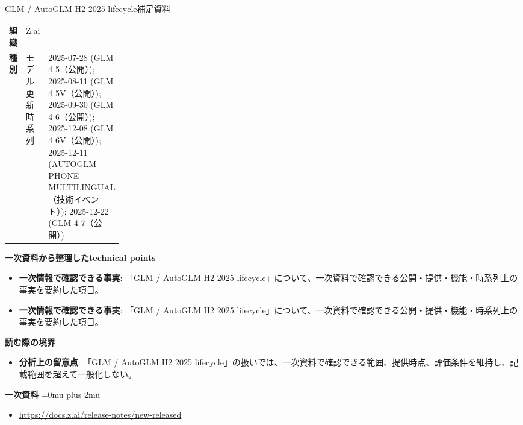 \begin{technicalnote}{GLM / AutoGLM H2 2025 lifecycle}{補足資料}
\begingroup
\begin{tabularx}{\linewidth}{@{}>{\bfseries}p{0.22\linewidth}X@{}}
組織 & Z.ai \\
種別 & モデル更新
時系列 & 2025-07-28 (GLM 4 5（公開）); 2025-08-11 (GLM 4 5V（公開）); 2025-09-30 (GLM 4 6（公開）); 2025-12-08 (GLM 4 6V（公開）); 2025-12-11 (AUTOGLM PHONE MULTILINGUAL（技術イベント）); 2025-12-22 (GLM 4 7（公開）) \\
\end{tabularx}
\smallskip
{\bfseries 一次資料から整理したtechnical points}
\begin{itemize}[leftmargin=1.5em,itemsep=0.35em]
\item \textbf{一次情報で確認できる事実}: 「GLM / AutoGLM H2 2025 lifecycle」について、一次資料で確認できる公開・提供・機能・時系列上の事実を要約した項目。
\item \textbf{一次情報で確認できる事実}: 「GLM / AutoGLM H2 2025 lifecycle」について、一次資料で確認できる公開・提供・機能・時系列上の事実を要約した項目。
\end{itemize}
\begin{minipage}{\linewidth}
{\bfseries 読む際の境界}
\begin{itemize}[leftmargin=1.5em,itemsep=0.35em]
\item \textbf{分析上の留意点}: 「GLM / AutoGLM H2 2025 lifecycle」の扱いでは、一次資料で確認できる範囲、提供時点、評価条件を維持し、記載範囲を超えて一般化しない。
\end{itemize}
\begin{samepage}
{\bfseries 一次資料}
\begingroup\sloppy
\Urlmuskip=0mu plus 2mu\relax
\begin{itemize}[leftmargin=1.5em,itemsep=0.25em]
\item {\scriptsize\url{https://docs.z.ai/release-notes/new-released}}
\end{itemize}
\endgroup
\end{samepage}
\end{minipage}
\endgroup
\end{technicalnote}
\medskip
